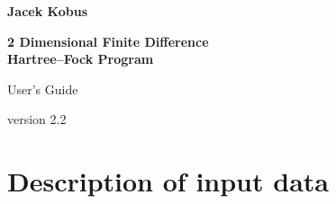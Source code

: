 \documentclass[12pt,a4paper]{article}
\newcommand{\clearemptydoublepage}{\newpage{\pagestyle{empty}\cleardoublepage}}
\begin{document}
\thispagestyle{empty}
\begin{center}

{\Large\bf Jacek Kobus\\[20pt]}

{\LARGE\bf 2 Dimensional Finite Difference \\[10pt]
Hartree--Fock Program}

\vskip 1cm

{\Large User's Guide}

\vskip 0.5cm

{\large version 2.2 }
\end{center}

\clearemptydoublepage
\tableofcontents
\thispagestyle{empty}
\clearemptydoublepage



\section{Description of input data}
\end{document}
